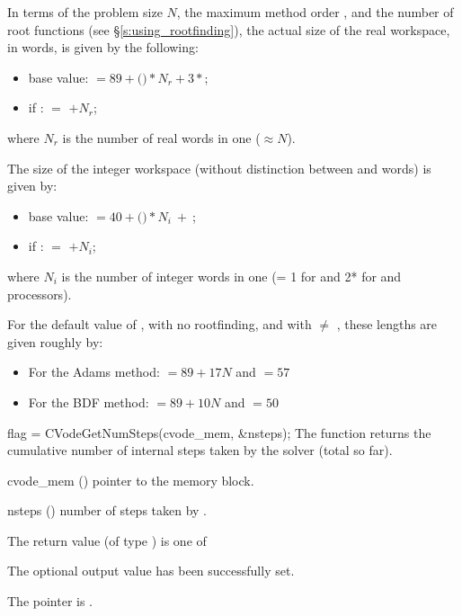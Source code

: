 {
  In terms of the problem size $N$, the maximum method order , and
  the number  of root functions (see \S\ref{s:using_rootfinding}),
  the actual size of the real workspace, in  words, is
  given by the following:
  \begin{itemize}
  \item base value:  $= 89 + ($$)*N_r + 3*$;
  \item if :  $=$  $+ N_r$;
  \end{itemize}
  where $N_r$ is the number of real words in one  ($\approx N$).

  The size of the integer workspace (without distinction between  
  and  words) is given by:
  \begin{itemize}
  \item base value:  $= 40 + ($$)*N_i ~ + ~ $;  
  \item if :  $=$  $+ N_i$;
  \end{itemize}
  where $N_i$ is the number of integer words in one 
  (= 1 for {\nvecs} and 2* for {\nvecp} and  processors).

  For the default value of , with no rootfinding, and with
   $\neq$ , these lengths are given roughly by:
  \begin{itemize}
  \item For the Adams method:  $= 89 + 17N$ and  $= 57$ 
  \item For the BDF method:  $= 89 + 10N$ and  $= 50$ 
  \end{itemize}
}
{
  flag = CVodeGetNumSteps(cvode\_mem, \&nsteps);
}
{
  The function  returns the cumulative number of internal 
  steps taken by the solver (total so far).
}
{
  \begin{args}
  \item[cvode\_mem] ()
    pointer to the {\cvode} memory block.
  \item[nsteps] ()
    number of steps taken by {\cvode}.
  \end{args}
}
{
  The return value  (of type ) is one of
  \begin{args}
  \item[\Id{CV\_SUCCESS}] 
    The optional output value has been successfully set.
  \item[\Id{CV\_MEM\_NULL}]
    The  pointer is .
  \end{args}
}
